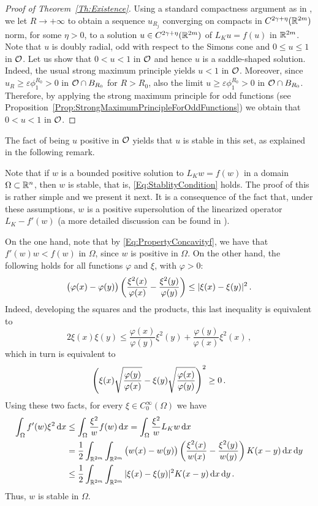 \begin{proof}[Proof of Theorem~\ref{Th:Existence}]
	Using a standard compactness argument as in \cite{FelipeSanz-Perela:IntegroDifferentialI}, we let $R\to +\infty$ to obtain a sequence $u_{R_j}$ converging on compacts in  $C^{2\gamma + \eta}(\mathbb{R}^{2m})$ norm, for some $\eta > 0$, to a solution $u \in C^{2\gamma + \eta}(\mathbb{R}^{2m})$ of $L_K u = f(u)$ in $\mathbb{R}^{2m}$. Note that $u$ is doubly radial, odd with respect to the Simons cone and $0\leq u \leq 1$ in $\mathcal{O}$. Let us show that $0 < u < 1$ in $\mathcal{O}$ and hence $u$ is a saddle-shaped solution. Indeed, the usual strong maximum principle yields $u<1$ in $\mathcal{O}$. Moreover, since $u_R\geq\varepsilon \phi_1^{R_0}>0$ in  $\mathcal{O} \cap B_{R_0}$ for $R>R_0$, also the limit $u\geq\varepsilon \phi_1^{R_0}>0$ in  $\mathcal{O} \cap B_{R_0}$. Therefore, by applying the strong maximum principle for odd functions (see Proposition~\ref{Prop:StrongMaximumPrincipleForOddFunctions}) we obtain that $0 < u < 1$ in $\mathcal{O}$.
\end{proof}


The fact of being $u$ positive in $\mathcal{O}$ yields that $u$ is stable in this set, as explained in the following remark. 


\begin{remark}
	\label{Remark:Stability}
	Note that if $w$ is a bounded positive solution to $L_K w = f(w)$ in a domain $\Omega\subset \mathbb{R}^n$, then $w$ is stable, that is, \eqref{Eq:StablityCondition} holds. The proof of this is rather simple and we present it next. It is a consequence of the fact that, under these assumptions, $w$ is a positive supersolution of the linearized operator $L_K - f'(w)$ (a more detailed discussion can be found in \cite{HamelRosOtonSireValdinoci}). 
	
	On the one hand, note that by \eqref{Eq:PropertyConcavityf}, we have that $f'(w)w<f(w)$ in $\Omega$, since $w$ is positive in $\Omega$. On the other hand, the following holds for all functions $\varphi$ and $\xi$, with $\varphi>0$:
	\begin{equation}
	\label{Eq:IdentityStability}
	\big (\varphi(x) - \varphi(y) \big) \left ( {\dfrac{\xi^2(x)}{\varphi(x)} - \dfrac{\xi^2(y)}{\varphi(y)} }\right ) \leq |\xi (x) - \xi(y)|^2\,.
	\end{equation}
	Indeed, developing the squares and the products, this last inequality is equivalent to
	$$
	2 \xi(x) \xi(y) \leq \dfrac{\varphi(x)}{\varphi(y)} \xi^2(y) +  \dfrac{\varphi(y)}{\varphi(x)} \xi^2 (x)\,,
	$$
	which in turn is equivalent to
	$$
	\left ( {\xi (x)\sqrt{\dfrac{\varphi(y)}{\varphi(x)}} - \xi(y) \sqrt{\dfrac{\varphi(x)}{\varphi(y)} } }\right )^2 \geq 0\,.
	$$
	Using these two facts, for every $\xi\in C^\infty_0(\Omega)$ we have
	\begin{align*}
	\int_\Omega f'(w) \xi^2 \,\mathrm{d} x & \leq \int_\Omega  \dfrac{\xi^2}{w} f(w) \,\mathrm{d} x = \int_\Omega  \dfrac{\xi^2}{w} L_Kw \,\mathrm{d} x \\ 
	&= \dfrac{1}{2} \int_{\mathbb{R}^{2m}} \int_{\mathbb{R}^{2m}} \big ( w(x) - w(y) \big) \left ( {\dfrac{\xi^2(x)}{w(x)} - \dfrac{\xi^2(y)}{w(y)} }\right ) K(x - y) \,\mathrm{d} x \,\mathrm{d} y
	\\ 
	&\leq \dfrac{1}{2} \int_{\mathbb{R}^{2m}} \int_{\mathbb{R}^{2m}} |\xi (x) - \xi(y)|^2 K(x - y) \,\mathrm{d} x \,\mathrm{d} y\,.
	\end{align*}
	Thus, $w$ is stable in $\Omega$.	
\end{remark}


